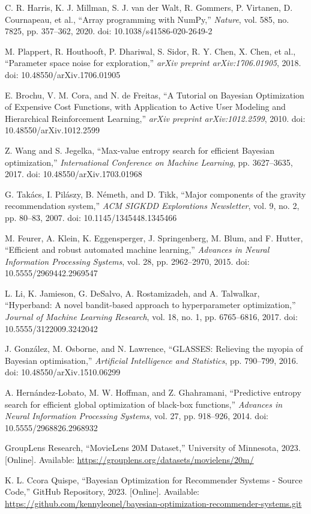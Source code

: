\documentclass[conference]{IEEEtran}
\begin{document}
\begin{thebibliography}{00}
C. R. Harris, K. J. Millman, S. J. van der Walt, R. Gommers, P. Virtanen, D. Cournapeau, et al., ``Array programming with NumPy,'' \textit{Nature}, vol. 585, no. 7825, pp. 357--362, 2020. doi: 10.1038/s41586-020-2649-2

M. Plappert, R. Houthooft, P. Dhariwal, S. Sidor, R. Y. Chen, X. Chen, et al., ``Parameter space noise for exploration,'' \textit{arXiv preprint arXiv:1706.01905}, 2018. doi: 10.48550/arXiv.1706.01905

E. Brochu, V. M. Cora, and N. de Freitas, ``A Tutorial on Bayesian Optimization of Expensive Cost Functions, with Application to Active User Modeling and Hierarchical Reinforcement Learning,'' \textit{arXiv preprint arXiv:1012.2599}, 2010. doi: 10.48550/arXiv.1012.2599

Z. Wang and S. Jegelka, ``Max-value entropy search for efficient Bayesian optimization,'' \textit{International Conference on Machine Learning}, pp. 3627--3635, 2017. doi: 10.48550/arXiv.1703.01968

G. Takács, I. Pilászy, B. Németh, and D. Tikk, ``Major components of the gravity recommendation system,'' \textit{ACM SIGKDD Explorations Newsletter}, vol. 9, no. 2, pp. 80--83, 2007. doi: 10.1145/1345448.1345466

M. Feurer, A. Klein, K. Eggensperger, J. Springenberg, M. Blum, and F. Hutter, ``Efficient and robust automated machine learning,'' \textit{Advances in Neural Information Processing Systems}, vol. 28, pp. 2962--2970, 2015. doi: 10.5555/2969442.2969547

L. Li, K. Jamieson, G. DeSalvo, A. Rostamizadeh, and A. Talwalkar, ``Hyperband: A novel bandit-based approach to hyperparameter optimization,'' \textit{Journal of Machine Learning Research}, vol. 18, no. 1, pp. 6765--6816, 2017. doi: 10.5555/3122009.3242042

J. González, M. Osborne, and N. Lawrence, ``GLASSES: Relieving the myopia of Bayesian optimisation,'' \textit{Artificial Intelligence and Statistics}, pp. 790--799, 2016. doi: 10.48550/arXiv.1510.06299

A. Hernández-Lobato, M. W. Hoffman, and Z. Ghahramani, ``Predictive entropy search for efficient global optimization of black-box functions,'' \textit{Advances in Neural Information Processing Systems}, vol. 27, pp. 918--926, 2014. doi: 10.5555/2968826.2968932

GroupLens Research, ``MovieLens 20M Dataset,'' University of Minnesota, 2023. [Online]. Available: \url{https://grouplens.org/datasets/movielens/20m/}

K. L. Ccora Quispe, ``Bayesian Optimization for Recommender Systems - Source Code,'' GitHub Repository, 2023. [Online]. Available: \url{https://github.com/kennyleonel/bayesian-optimization-recommender-systems.git}

\end{thebibliography}
\end{document}
